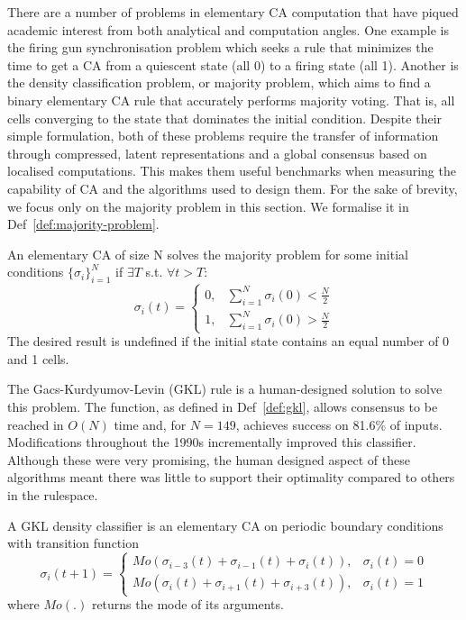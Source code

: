 There are a number of problems in elementary CA computation that have piqued academic interest from both analytical and computation angles. One example is the firing gun synchronisation problem\cite{moore1964firing} which seeks a rule that minimizes the time to get a CA from a quiescent state (all 0) to a firing state (all 1). Another is the density classification problem, or majority problem, which aims to find a binary elementary CA rule that accurately performs majority voting. That is, all cells converging to the state that dominates the initial condition. Despite their simple formulation, both of these problems require the transfer of information through compressed, latent representations and a global consensus based on localised computations. This makes them useful benchmarks when measuring the capability of CA and the algorithms used to design them. For the sake of brevity, we focus only on the majority problem in this section. We formalise it in Def~\ref{def:majority-problem}.

\begin{definition}\label{def:majority-problem}
An elementary CA of size N solves the majority problem for some initial conditions $\{\sigma_i\}_{i=1}^{N}$ if $\exists T$ s.t. $\forall t > T$:
\begin{equation}
    \sigma_i(t) = 
    \begin{cases}
    0, & \sum_{i=1}^{N}\sigma_i(0) < \frac{N}{2} \\
    1, & \sum_{i=1}^{N}\sigma_i(0) > \frac{N}{2}
    \end{cases}
\end{equation}
The desired result is undefined if the initial state contains an equal number of 0 and 1 cells.
\end{definition}

The Gacs-Kurdyumov-Levin (GKL) rule is a human-designed solution to solve this problem. The function, as defined in Def~\ref{def:gkl}, allows consensus to be reached in $O(N)$ time and, for $N=149$, achieves success on 81.6\% of inputs\cite{gacs1978one}. Modifications throughout the 1990s incrementally improved this classifier\cite{das1995evolving}. Although these were very promising, the human designed aspect of these algorithms meant there was little to support their optimality compared to others in the rulespace.

\begin{definition} \label{def:gkl}
A GKL density classifier is an elementary CA on periodic boundary conditions with transition function
\begin{equation}
   \sigma_i(t+1) =
    \begin{cases}
    Mo(\sigma_{i-3}(t) + \sigma_{i-1}(t) + \sigma_i(t)), & \sigma_i(t) = 0 \\
    Mo(\sigma_i(t) + \sigma_{i+1}(t) + \sigma_{i+3}(t)), & \sigma_i(t) = 1
    \end{cases}
\end{equation}
where $Mo(.)$ returns the mode of its arguments.
\end{definition}

